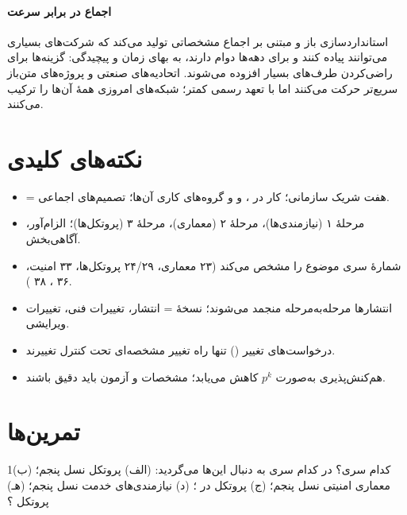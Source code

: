 \documentclass[11pt,a4paper]{article}
\begin{document}
\paragraph{اجماع در برابر سرعت} استانداردسازی باز و مبتنی بر اجماع مشخصاتی تولید می‌کند که شرکت‌های بسیاری می‌توانند پیاده
کنند و برای دهه‌ها دوام دارند، به بهای زمان و پیچیدگی: گزینه‌ها برای راضی‌کردن طرف‌های بسیار افزوده می‌شوند. اتحادیه‌های
صنعتی و پروژه‌های متن‌باز سریع‌تر حرکت می‌کنند اما با تعهد رسمی کمتر؛ شبکه‌های امروزی همهٔ آن‌ها را ترکیب می‌کنند.

\section{نکته‌های کلیدی}
\begin{takeawaybox}
\begin{itemize}
  \item {} = هفت شریک سازمانی؛ کار در ،  و  و گروه‌های کاری آن‌ها؛ تصمیم‌های اجماعی.
  \item مرحلهٔ ۱ (نیازمندی‌ها)، مرحلهٔ ۲ (معماری)، مرحلهٔ ۳ (پروتکل‌ها)؛  الزام‌آور،  آگاهی‌بخش.
  \item شمارهٔ سری موضوع را مشخص می‌کند (۲۳ معماری، ۲۴/۲۹ پروتکل‌ها، ۳۳ امنیت، ۳۶ ، ۳۸ ).
  \item انتشارها مرحله‌به‌مرحله منجمد می‌شوند؛ نسخهٔ  = انتشار، تغییرات فنی، تغییرات ویرایشی.
  \item درخواست‌های تغییر () تنها راه تغییر مشخصه‌ای تحت کنترل تغییرند.
  \item هم‌کنش‌پذیری به‌صورت $p^k$ کاهش می‌یابد؛ مشخصات و آزمون باید دقیق باشند.
\end{itemize}
\end{takeawaybox}

\section{تمرین‌ها}

\begin{exercisebox}{1}{کدام سری؟}\label{exr:series}
در کدام سری به دنبال این‌ها می‌گردید: (الف) پروتکل  نسل پنجم؛ (ب) معماری امنیتی نسل پنجم؛ (ج) پروتکل 
در ؛ (د) نیازمندی‌های خدمت نسل پنجم؛ (هـ) پروتکل ؟
\end{exercisebox}
\end{document}
